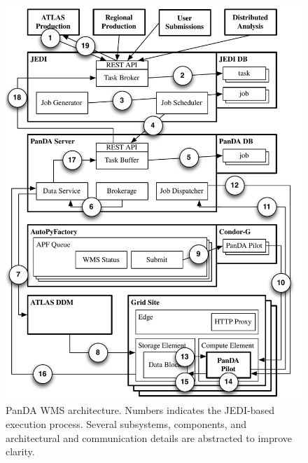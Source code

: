 \begin{figure}
    \centering
    \includegraphics[width=\columnwidth]{figures/panda_architecture.pdf}
    \vspace{-0.3in}
    \caption{PanDA WMS architecture. Numbers indicates the JEDI-based
    execution process. Several subsystems, components, and architectural and
    communication details are abstracted to improve clarity.}
\label{fig:architecture}
\end{figure}